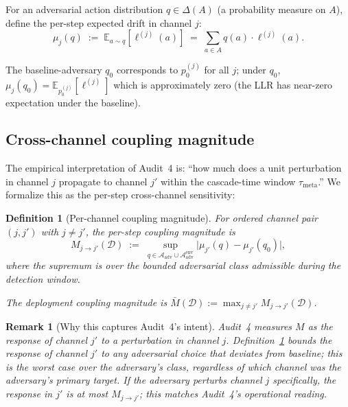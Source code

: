 \documentclass{article}
\newtheorem{definition}{Definition}
\newtheorem{remark}{Remark}
\newcommand{\Aadv}{\mathcal{A}_{\mathrm{adv}}}
\begin{document}
For an adversarial action distribution $q \in \Delta(A)$ (a
probability measure on $A$), define the per-step expected drift in
channel $j$:
\begin{equation}
\label{eq:drift-def}
  \mu_j(q) \;:=\; \mathbb{E}_{a \sim q}[\ell^{(j)}(a)]
  \;=\; \sum_{a \in A} q(a) \cdot \ell^{(j)}(a).
\end{equation}

The baseline-adversary $q_0$ corresponds to $p_0^{(j)}$ for all
$j$; under $q_0$, $\mu_j(q_0) = \mathbb{E}_{p_0^{(j)}}[\ell^{(j)}]$
which is approximately zero (the LLR has near-zero expectation
under the baseline).

\subsection{Cross-channel coupling magnitude}

The empirical interpretation of Audit~4 is:
``how much does a unit perturbation in channel $j$ propagate to
channel $j'$ within the cascade-time window
$\tau_{\mathrm{meta}}$.''  We formalize this as the per-step
cross-channel sensitivity:

\begin{definition}[Per-channel coupling magnitude]
\label{def:M-formal}
For ordered channel pair $(j, j')$ with $j \neq j'$, the
\emph{per-step coupling magnitude} is
\begin{equation}
\label{eq:M-def}
  M_{j \to j'}(\mathcal{D})
  \;:=\; \sup_{q \in \Aadv \cup \Aadv^{\mathrm{env}}}
  \big| \mu_{j'}(q) - \mu_{j'}(q_0) \big|,
\end{equation}
where the supremum is over the bounded adversarial class
admissible during the detection window.

The \emph{deployment coupling magnitude} is
$\bar{M}(\mathcal{D}) := \max_{j \neq j'} M_{j \to j'}(\mathcal{D})$.
\end{definition}

\begin{remark}[Why this captures Audit~4's intent]
\label{rem:M-intent}
Audit~4 measures $M$ as the response of channel $j'$ to a
perturbation in channel $j$.  Definition~\ref{def:M-formal} bounds
the response of channel $j'$ to \emph{any} adversarial choice that
deviates from baseline; this is the worst case over the
adversary's class, regardless of which channel was the
adversary's primary target.  If the adversary perturbs channel $j$
specifically, the response in $j'$ is at most
$M_{j \to j'}$; this matches Audit~4's operational reading.
\end{remark}
\end{document}
